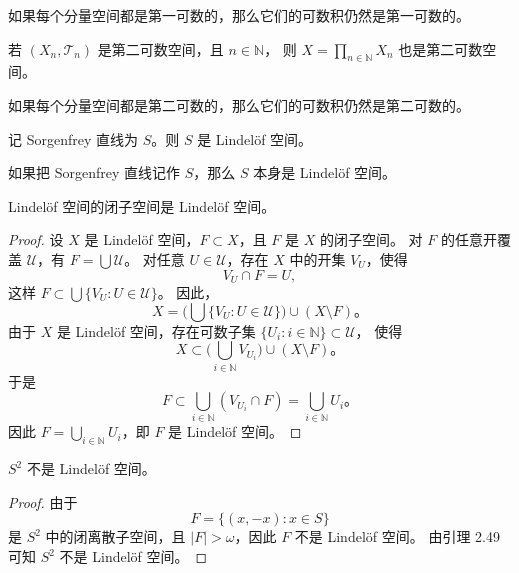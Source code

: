\begin{note}
如果每个分量空间都是第一可数的，那么它们的可数积仍然是第一可数的。
\end{note}
\begin{theorem}[第二可数空间的可数积仍第二可数]\label{thm:countable-product-second-countable}
若 \((X_n, \mathcal{T}_n)\) 是第二可数空间，且 \(n \in \mathbb{N}\)，  
则 \(X = \displaystyle \prod_{n \in \mathbb{N}} X_n\) 也是第二可数空间。
\end{theorem}

\begin{note}
如果每个分量空间都是第二可数的，那么它们的可数积仍然是第二可数的。
\end{note}

\begin{lemma}\label{lem:sorgenfrey-lindelof}
记 Sorgenfrey 直线为 \(S\)。则 \(S\) 是 Lindelöf 空间。
\end{lemma}

\begin{note}
如果把 Sorgenfrey 直线记作 \(S\)，那么 \(S\) 本身是 Lindelöf 空间。
\end{note}
\begin{lemma}\label{lem:lindelof-closed-subspace}
Lindelöf 空间的闭子空间是 Lindelöf 空间。
\end{lemma}

\begin{proof}
设 \(X\) 是 Lindelöf 空间，\(F \subset X\)，且 \(F\) 是 \(X\) 的闭子空间。  
对 \(F\) 的任意开覆盖 \(\mathcal{U}\)，有 \(F = \bigcup \mathcal{U}\)。  
对任意 \(U \in \mathcal{U}\)，存在 \(X\) 中的开集 \(V_U\)，使得  
\[
V_U \cap F = U,
\]
这样 \(F \subset \bigcup \{V_U : U \in \mathcal{U}\}\)。  
因此，
\[
X = \Big(\bigcup \{V_U : U \in \mathcal{U}\}\Big) \cup (X \setminus F)。
\]
由于 \(X\) 是 Lindelöf 空间，存在可数子集 \(\{U_i : i \in \mathbb{N}\} \subset \mathcal{U}\)，  
使得
\[
X \subset \Big(\bigcup_{i \in \mathbb{N}} V_{U_i}\Big) \cup (X \setminus F)。
\]
于是
\[
F \subset \bigcup_{i \in \mathbb{N}} (V_{U_i} \cap F)
= \bigcup_{i \in \mathbb{N}} U_i。
\]
因此 \(F = \bigcup_{i \in \mathbb{N}} U_i\)，即 \(F\) 是 Lindelöf 空间。
\end{proof}
\begin{corollary}[2.50]
$S^2$ 不是 Lindelöf 空间。
\end{corollary}

\begin{proof}
由于 
\[
F = \{(x,-x): x\in S\}
\]
是 $S^2$ 中的闭离散子空间，且 $|F|>\omega$，因此 $F$ 不是 Lindelöf 空间。  
由引理 2.49 可知 $S^2$ 不是 Lindelöf 空间。
\end{proof}



